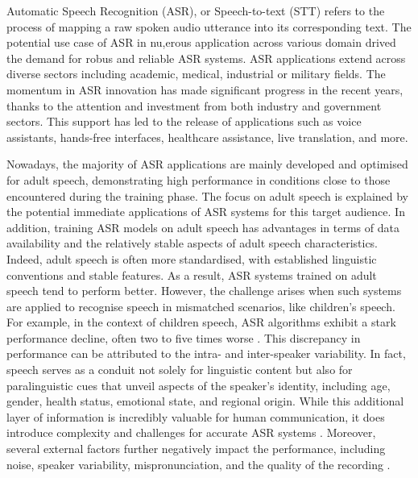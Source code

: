 \label{chap:Chapter2}
\cleardoublepage
Automatic Speech Recognition (ASR), or Speech-to-text (STT) refers to the process of mapping a raw spoken audio utterance into its corresponding text. The potential use case of ASR in nu,erous application across various domain drived the demand for robus and reliable ASR systems. ASR applications extend across diverse sectors including academic, medical, industrial or military fields. The momentum in ASR innovation has made significant progress in the recent years, thanks to the attention and investment from both industry and government sectors. This support has led to the release of applications such as voice assistants, hands-free interfaces, healthcare assistance, live translation, and more.

Nowadays, the majority of ASR applications are mainly developed and optimised for adult speech, demonstrating high performance in conditions close to those encountered during the training phase. The focus on adult speech is explained by the potential immediate applications of ASR systems for this target audience. In addition, training ASR models on adult speech has advantages in terms of data availability and the relatively stable aspects of adult speech characteristics. Indeed, adult speech is often more standardised, with established linguistic conventions and stable features. As a result, ASR systems trained on adult speech tend to perform better.
However, the challenge arises when such systems are applied to recognise speech in mismatched scenarios, like children's speech. For example, in the context of children speech, ASR algorithms exhibit a stark performance decline, often two to five times worse \cite{childrenSpeechWorse}. This discrepancy in performance can be attributed to the intra- and inter-speaker variability. In fact, speech serves as a conduit not solely for linguistic content but also for paralinguistic cues that unveil aspects of the speaker's identity, including age, gender, health status, emotional state, and regional origin. While this additional layer of information is incredibly valuable for human communication, it does introduce complexity and challenges for accurate ASR systems \cite{li2023asr}.
Moreover, several external factors further negatively impact the performance, including noise, speaker variability, mispronunciation, and the quality of the recording \cite{li2014overview,king2017robust}.


